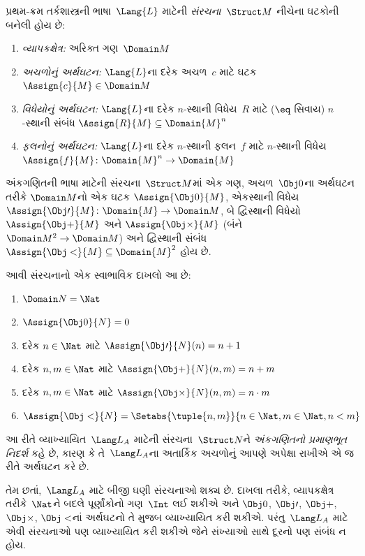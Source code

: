 \begin{defn}[સંરચનાઓ]
પ્રથમ-ક્રમ તર્કશાસ્ત્રની ભાષા~$\Lang{L}$ માટેની 
\emph{સંરચના}~$\Struct M$ નીચેના ઘટકોની બનેલી હોય છે:
\begin{enumerate}
\item \emph{વ્યાપકક્ષેત્ર:} અરિક્ત ગણ~$\Domain M$
\item \emph{અચળોનું અર્થઘટન:} $\Lang{L}$ના દરેક
  અચળ~$c$ માટે ઘટક~$\Assign{c}{M} \in \Domain M$
\item \emph{વિધેયોનું અર્થઘટન:} $\Lang{L}$ના દરેક $n$-સ્થાની
  વિધેય~$R$ માટે ($\eq$ સિવાય) $n$-સ્થાની સંબંધ
  $\Assign{R}{M} \subseteq \Domain{M}^n$
\item \emph{ફલનોનું અર્થઘટન:} $\Lang{L}$ના દરેક $n$-સ્થાની
  ફલન~$f$ માટે $n$-સ્થાની વિધેય
  $\Assign{f}{M} \colon \Domain{M}^n \to \Domain{M}$
\end{enumerate}
\end{defn}

\begin{ex}
અંકગણિતની ભાષા માટેની સંરચના~$\Struct M$માં એક ગણ,
અચળ~$\Obj 0$ના અર્થઘટન તરીકે $\Domain M$નો એક ઘટક
$\Assign{\Obj 0}{M}$, એકસ્થાની વિધેય
$\Assign{\Obj \prime}{M} \colon \Domain{M} \to \Domain M$, બે
દ્વિસ્થાની વિધેયો $\Assign{\Obj +}{M}$ અને $\Assign{\Obj
  \times}{M}$ (બંને $\Domain M^2 \to \Domain M$) અને દ્વિસ્થાની
સંબંધ $\Assign{\Obj <}{M} \subseteq \Domain{M}^2$ હોય છે.

આવી સંરચનાનો એક સ્વાભાવિક દાખલો આ છે:
\begin{enumerate}
\item $\Domain N = \Nat$
\item $\Assign{\Obj 0}{N} = 0$
\item દરેક $n \in \Nat$ માટે $\Assign{\Obj \prime}{N}(n) = n + 1$
\item દરેક $n, m \in \Nat$ માટે $\Assign{\Obj +}{N}(n, m) = n + m$
\item દરેક $n, m \in \Nat$ માટે $\Assign{\Obj \times}{N}(n, m) = n\cdot m$
\item $\Assign{\Obj <}{N} = \Setabs{\tuple{n, m}}{n \in \Nat, m \in
  \Nat, n < m}$
\end{enumerate}
આ રીતે વ્યાખ્યાયિત~$\Lang L_A$ માટેની સંરચના~$\Struct N$ને
\emph{અંકગણિતનો પ્રમાણભૂત નિદર્શ} કહે છે, કારણ કે તે~$\Lang L_A$ના
અતાર્કિક અચળોનું આપણે અપેક્ષા રાખીએ એ જ રીતે અર્થઘટન કરે છે.

તેમ છતાં,~$\Lang L_A$ માટે બીજી ઘણી સંરચનાઓ શક્ય છે. દાખલા
તરીકે, વ્યાપકક્ષેત્ર તરીકે~$\Nat$ને બદલે પૂર્ણાંકોનો ગણ~$\Int$ લઈ શકીએ અને
$\Obj 0$, $\Obj \prime$, $\Obj +$, $\Obj \times$, $\Obj <$નાં
અર્થઘટનો તે મુજબ વ્યાખ્યાયિત કરી શકીએ. પરંતુ~$\Lang L_A$ માટે એવી
સંરચનાઓ પણ વ્યાખ્યાયિત કરી શકીએ જેને સંખ્યાઓ સાથે દૂરનો પણ સંબંધ ન
હોય.
\end{ex}

